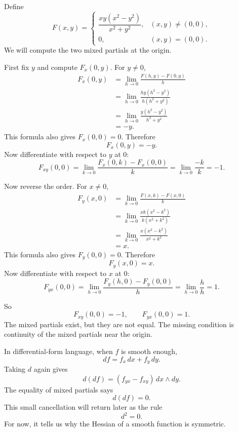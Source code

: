 \begin{example}
Define
\[
    F(x,y)=
    \begin{cases}
    \dfrac{xy(x^2-y^2)}{x^2+y^2}, & (x,y)\ne(0,0),\\[3mm]
    0, & (x,y)=(0,0).
    \end{cases}
\]
We will compute the two mixed partials at the origin.

First fix \(y\) and compute \(F_x(0,y)\).  For \(y\ne0\),
\[
\begin{aligned}
F_x(0,y)
&=
\lim_{h\to0}
\frac{F(h,y)-F(0,y)}{h} \\[1mm]
&=
\lim_{h\to0}
\frac{hy(h^2-y^2)}{h(h^2+y^2)}\\[1mm]
&=
\lim_{h\to0}
\frac{y(h^2-y^2)}{h^2+y^2}\\[1mm]
&=
-y.
\end{aligned}
\]
This formula also gives \(F_x(0,0)=0\).  Therefore
\[
    F_x(0,y)=-y.
\]
Now differentiate with respect to \(y\) at \(0\):
\[
    F_{xy}(0,0)
    =
    \lim_{k\to0}\frac{F_x(0,k)-F_x(0,0)}{k}
    =
    \lim_{k\to0}\frac{-k}{k}
    =
    -1.
\]

Now reverse the order.  For \(x\ne0\),
\[
\begin{aligned}
F_y(x,0)
&=
\lim_{k\to0}
\frac{F(x,k)-F(x,0)}{k}\\[1mm]
&=
\lim_{k\to0}
\frac{xk(x^2-k^2)}{k(x^2+k^2)}\\[1mm]
&=
\lim_{k\to0}
\frac{x(x^2-k^2)}{x^2+k^2}\\[1mm]
&=
x.
\end{aligned}
\]
This formula also gives \(F_y(0,0)=0\).  Therefore
\[
    F_y(x,0)=x.
\]
Now differentiate with respect to \(x\) at \(0\):
\[
    F_{yx}(0,0)
    =
    \lim_{h\to0}\frac{F_y(h,0)-F_y(0,0)}{h}
    =
    \lim_{h\to0}\frac{h}{h}
    =
    1.
\]

So
\[
\boxed{
    F_{xy}(0,0)=-1,
    \qquad
    F_{yx}(0,0)=1.
}
\]
The mixed partials exist, but they are not equal.  The missing condition is continuity
of the mixed partials near the origin.
\end{example}

In differential-form language, when \(f\) is smooth enough,
\[
    df=f_x\,dx+f_y\,dy.
\]
Taking \(d\) again gives
\[
    d(df)=(f_{yx}-f_{xy})\,dx\wedge dy.
\]
The equality of mixed partials says
\[
    d(df)=0.
\]
This small cancellation will return later as the rule
\[
    d^2=0.
\]
For now, it tells us why the Hessian of a smooth function is symmetric.

